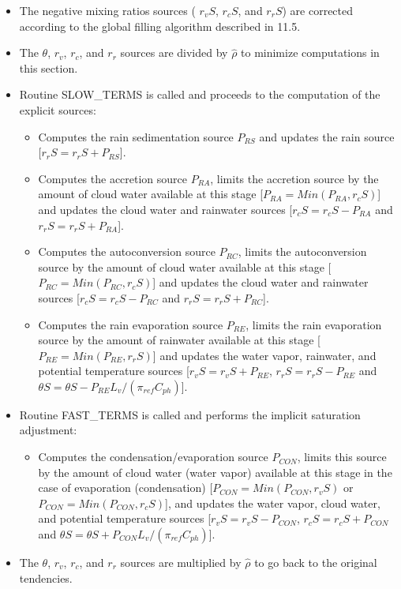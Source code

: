 \begin{itemize}
\item
The negative mixing ratios sources ( $r_vS$, $r_cS$, and  $r_rS$)
are corrected according to the global filling algorithm described in 11.5.

\item
The  $\theta$, $r_v$, $r_c$, and $r_r$ sources are divided by $\hat \rho$
to minimize computations in this section.


\item
Routine SLOW\_TERMS is called and proceeds to the computation of the
explicit sources:

\begin{itemize}
\item
Computes the rain sedimentation source $P_{RS}$ and updates the rain
source [$r_r S = r_rS + P_{RS}$].

\item
Computes the  accretion source $P_{RA}$, limits the accretion source
by the amount of cloud water available at this stage
[$P_{RA} = Min (P_{RA}, r_cS)$] and updates the cloud water and rainwater
sources
[$r_c S = r_c S - P_{RA}$ and  $r_r S = r_r S + P_{RA}$].

\item
Computes the  autoconversion source $P_{RC}$, limits the autoconversion
source by the amount of cloud water available at this stage
[$P_{RC} = Min (P_{RC}, r_cS)$] and updates the cloud water and rainwater
sources
[$r_c S = r_c S - P_{RC}$ and  $r_r S = r_r S + P_{RC}$].

\item
Computes the  rain evaporation source $P_{RE}$, limits the rain
evaporation  source by the amount of rainwater available at this stage
[$P_{RE} = Min (P_{RE}, r_rS)$] and updates the water vapor, rainwater, and
potential temperature sources
[$r_v S = r_v S + P_{RE}$,  $r_r S = r_r S - P_{RE}$ and $\theta S = \theta S
- P_{RE} L_v / (\pi_{ref} C_{ph})$].
\end{itemize}

\item
Routine FAST\_TERMS is called and performs the implicit saturation
adjustment:

\begin{itemize}
\item
Computes the condensation/evaporation source $P_{CON}$, limits this
source by  the amount of cloud water (water vapor) available at this stage in
the case of evaporation (condensation) [$P_{CON} = Min (P_{CON}, r_vS)$
or $P_{CON} = Min (P_{CON}, r_cS)$], and updates  the water vapor,
cloud water, and potential temperature sources
[$r_v S = r_v S - P_{CON}$,  $r_c S = r_c S + P_{CON}$ and $\theta S = \theta S
+ P_{CON} L_v / (\pi_{ref} C_{ph})$].
\end{itemize}

\item
The  $\theta$, $r_v$, $r_c$, and $r_r$ sources are multiplied by $\hat \rho$
to go back to the original tendencies.
\end{itemize}

